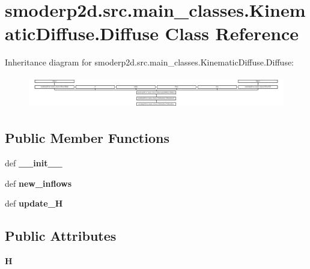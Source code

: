 \hypertarget{classsmoderp2d_1_1src_1_1main__classes_1_1KinematicDiffuse_1_1Diffuse}{\section{smoderp2d.\-src.\-main\-\_\-classes.\-Kinematic\-Diffuse.\-Diffuse Class Reference}
\label{classsmoderp2d_1_1src_1_1main__classes_1_1KinematicDiffuse_1_1Diffuse}
}
Inheritance diagram for smoderp2d.\-src.\-main\-\_\-classes.\-Kinematic\-Diffuse.\-Diffuse\-:\begin{figure}[H]
\begin{center}
\leavevmode
\includegraphics[height=1.414141cm]{d0/d0a/classsmoderp2d_1_1src_1_1main__classes_1_1KinematicDiffuse_1_1Diffuse}
\end{center}
\end{figure}
\subsection*{Public Member Functions}
\begin{DoxyCompactItemize}
\item 
\hypertarget{classsmoderp2d_1_1src_1_1main__classes_1_1KinematicDiffuse_1_1Diffuse_a037b417e061247ef505ca1416f65006c}{def {\bfseries \-\_\-\-\_\-init\-\_\-\-\_\-}}\label{classsmoderp2d_1_1src_1_1main__classes_1_1KinematicDiffuse_1_1Diffuse_a037b417e061247ef505ca1416f65006c}

\item 
\hypertarget{classsmoderp2d_1_1src_1_1main__classes_1_1KinematicDiffuse_1_1Diffuse_a927915b728f8e553dfd8d62733e27bf5}{def {\bfseries new\-\_\-inflows}}\label{classsmoderp2d_1_1src_1_1main__classes_1_1KinematicDiffuse_1_1Diffuse_a927915b728f8e553dfd8d62733e27bf5}

\item 
\hypertarget{classsmoderp2d_1_1src_1_1main__classes_1_1KinematicDiffuse_1_1Diffuse_a7e70d7ef597897be0d0acdfe3390ce1b}{def {\bfseries update\-\_\-\-H}}\label{classsmoderp2d_1_1src_1_1main__classes_1_1KinematicDiffuse_1_1Diffuse_a7e70d7ef597897be0d0acdfe3390ce1b}

\end{DoxyCompactItemize}
\subsection*{Public Attributes}
\begin{DoxyCompactItemize}
\item 
\hypertarget{classsmoderp2d_1_1src_1_1main__classes_1_1KinematicDiffuse_1_1Diffuse_a35cd9807eadd4db62eeafe7c657475a9}{{\bfseries H}}\label{classsmoderp2d_1_1src_1_1main__classes_1_1KinematicDiffuse_1_1Diffuse_a35cd9807eadd4db62eeafe7c657475a9}

\end{DoxyCompactItemize}


